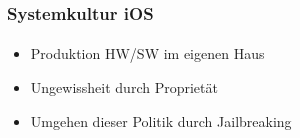\begin{frame}
\frametitle{Systemkultur iOS}
\framesubtitle{}

\begin{itemize}\itemsep10pt
  \item Produktion HW/SW im eigenen Haus
  \item Ungewissheit durch Proprietät
  \item Umgehen dieser Politik durch Jailbreaking
\end{itemize}
\end{frame}